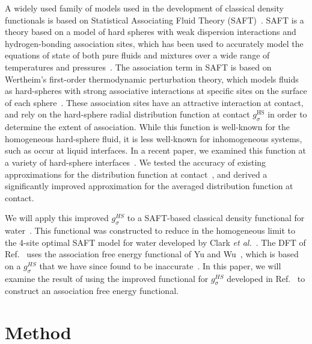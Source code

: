 \documentclass[twocolumn,amsmath,amssymb,prl]{revtex4-1}
\begin{document}
A widely used family of models used in the development of classical
density functionals is based on Statistical Associating Fluid Theory
(SAFT)~\cite{chapman1989saft}.  SAFT is a theory based on a model of
hard spheres with weak dispersion interactions and hydrogen-bonding
association sites, which has been used to accurately model the
equations of state of both pure fluids and mixtures over a wide range
of temperatures and pressures~\cite{muller2001molecular,
  tan2008recent}.  The association term in SAFT is based on Wertheim's
first-order thermodynamic perturbation theory, which models fluids as
hard-spheres with strong associative interactions at specific sites on
the surface of each sphere~\cite{wertheim1984fluidsI,
  wertheim1984fluidsII, wertheim1986fluidsIII, wertheim1986fluidsIV}.
These association sites have an attractive interaction at contact, and
rely on the hard-sphere radial distribution function at contact
$g_\sigma^\text{HS}$ in order to determine the extent of association.
While this function is well-known for the homogeneous hard-sphere
fluid, it is less well-known for inhomogeneous systems, such as occur
at liquid interfaces.  In a recent paper, we examined this function at
a variety of hard-sphere interfaces~\cite{schulte2012using}.  We
tested the accuracy of existing approximations for the distribution
function at contact~\cite{yu2002fmt-dft-inhomogeneous-associating,
  gross2009density}, and derived a significantly improved
approximation for the averaged distribution function at contact.

We will apply this improved $g_\sigma^{HS}$ to a SAFT-based classical
density functional for water~\cite{hughes2013classical}.  This
functional was constructed to reduce in the homogeneous limit
to the 4-site optimal SAFT model for water developed by Clark \emph{et
  al.}~\cite{clark2006developing}.  The DFT of
Ref.~ uses the association free energy
functional of Yu and
Wu~\cite{yu2002fmt-dft-inhomogeneous-associating}, which is based on a
$g_\sigma^{HS}$ that we have since found to be
inaccurate~\cite{schulte2012using}.  In this paper, we will examine
the result of using the improved functional for $g_\sigma^{HS}$
developed in Ref.~ to construct an
association free energy functional.

\section{Method}
\end{document}
